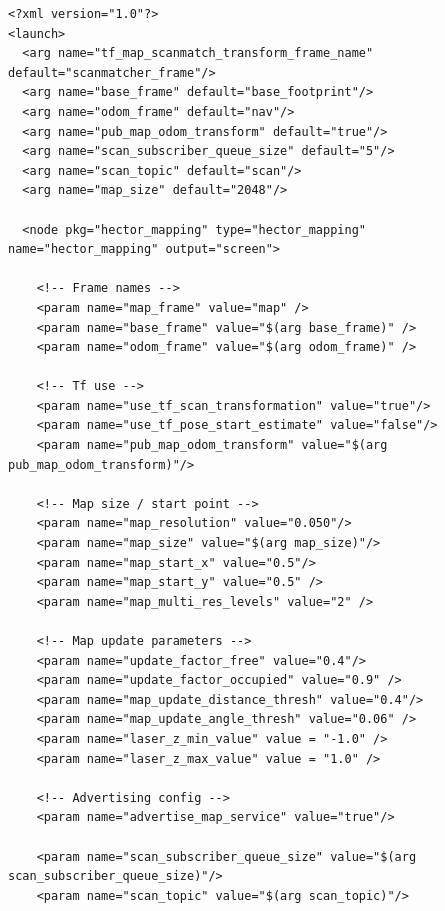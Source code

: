 \begin{lrbox}{\mybox}
\begin{lstlisting}[caption=Hector SLAMの座標系の設定,label=slam:s4]
<?xml version="1.0"?>
<launch>
  <arg name="tf_map_scanmatch_transform_frame_name" default="scanmatcher_frame"/>
  <arg name="base_frame" default="base_footprint"/>
  <arg name="odom_frame" default="nav"/>
  <arg name="pub_map_odom_transform" default="true"/>
  <arg name="scan_subscriber_queue_size" default="5"/>
  <arg name="scan_topic" default="scan"/>
  <arg name="map_size" default="2048"/>
  
  <node pkg="hector_mapping" type="hector_mapping" name="hector_mapping" output="screen">
    
    <!-- Frame names -->
    <param name="map_frame" value="map" />
    <param name="base_frame" value="$(arg base_frame)" />
    <param name="odom_frame" value="$(arg odom_frame)" />
    
    <!-- Tf use -->
    <param name="use_tf_scan_transformation" value="true"/>
    <param name="use_tf_pose_start_estimate" value="false"/>
    <param name="pub_map_odom_transform" value="$(arg pub_map_odom_transform)"/>
    
    <!-- Map size / start point -->
    <param name="map_resolution" value="0.050"/>
    <param name="map_size" value="$(arg map_size)"/>
    <param name="map_start_x" value="0.5"/>
    <param name="map_start_y" value="0.5" />
    <param name="map_multi_res_levels" value="2" />
    
    <!-- Map update parameters -->
    <param name="update_factor_free" value="0.4"/>
    <param name="update_factor_occupied" value="0.9" />    
    <param name="map_update_distance_thresh" value="0.4"/>
    <param name="map_update_angle_thresh" value="0.06" />
    <param name="laser_z_min_value" value = "-1.0" />
    <param name="laser_z_max_value" value = "1.0" />
    
    <!-- Advertising config --> 
    <param name="advertise_map_service" value="true"/>
    
    <param name="scan_subscriber_queue_size" value="$(arg scan_subscriber_queue_size)"/>
    <param name="scan_topic" value="$(arg scan_topic)"/>
    

\end{lstlisting}
\end{lrbox}
